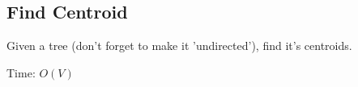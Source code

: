 \subsection{Find Centroid}

Given a tree (don't forget to make it 'undirected'), find it's centroids.

Time: $O(V)$
